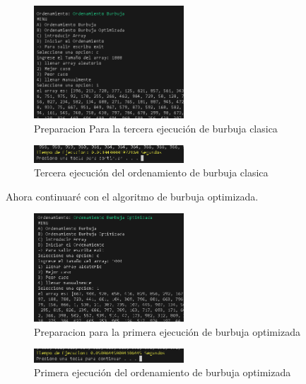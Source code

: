 \documentclass[journal]{IEEEtran}
\begin{document}
  \begin{figure}[H]
    \centering
    \begin{adjustbox}{clip=false}
      \includegraphics[width=0.5\textwidth]{12.PNG}
    \end{adjustbox}
    \caption{Preparacion Para la tercera ejecución de burbuja clasica}
  \end{figure}
  \begin{figure}[H]
    \centering
    \begin{adjustbox}{clip=false}
      \includegraphics[width=0.5\textwidth]{13.PNG}
    \end{adjustbox}
    \caption{Tercera ejecución del ordenamiento de burbuja clasica}
  \end{figure}
  Ahora continuaré con el algoritmo de burbuja optimizada.
  \begin{figure}[H]
    \centering
    \begin{adjustbox}{clip=false}
      \includegraphics[width=0.5\textwidth]{14.PNG}
    \end{adjustbox}
    \caption{Preparacion para la primera ejecución de burbuja optimizada}
  \end{figure}
  \begin{figure}[H]
    \centering
    \begin{adjustbox}{clip=false}
      \includegraphics[width=0.5\textwidth]{15.PNG}
    \end{adjustbox}
    \caption{Primera ejecución del ordenamiento de burbuja optimizada}
  \end{figure}
\end{document}
